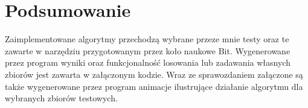 \documentclass[11pt,a4paper]{article}
\begin{document}
\section{Podsumowanie}
Zaimplementowane algorytmy przechodzą wybrane przeze mnie testy 
oraz te zawarte w narzędziu przygotowanym przez koło naukowe Bit.
Wygenerowane przez program wyniki oraz funkcjonalność losowania
lub zadawania własnych zbiorów jest zawarta w załączonym kodzie.
Wraz ze sprawozdaniem załączone są także wygenerowane przez program
animacje ilustrujące działanie algorytmu dla wybranych zbiorów testowych.
\end{document}
